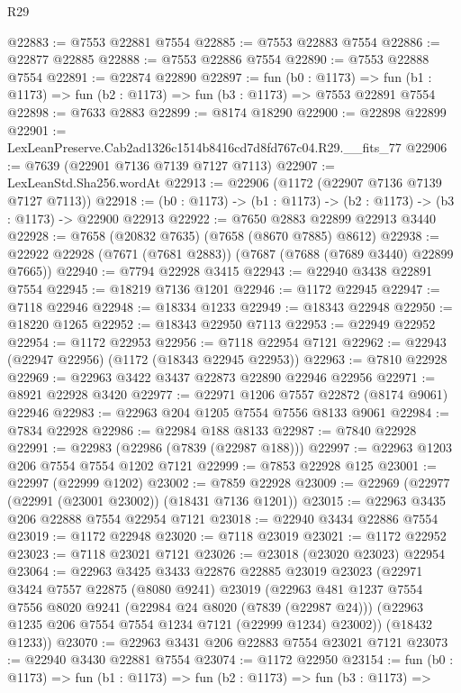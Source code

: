 \begin{lexlean}{R29}
\begin{coremodule}
@22883 := @7553 @22881 @7554
@22885 := @7553 @22883 @7554
@22886 := @22877 @22885
@22888 := @7553 @22886 @7554
@22890 := @7553 @22888 @7554
@22891 := @22874 @22890
@22897 := fun (b0 : @1173) =>
  fun (b1 : @1173) => fun (b2 : @1173) => fun (b3 : @1173) => @7553 @22891 @7554
@22898 := @7633 @2883
@22899 := @8174 @18290
@22900 := @22898 @22899
@22901 := LexLeanPreserve.Cab2ad1326c1514b8416cd7d8fd767c04.R29.__fits_77
@22906 := @7639 (@22901 @7136 @7139 @7127 @7113)
@22907 := LexLeanStd.Sha256.wordAt
@22913 := @22906 (@1172 (@22907 @7136 @7139 @7127 @7113))
@22918 := (b0 : @1173) -> (b1 : @1173) -> (b2 : @1173) -> (b3 : @1173) -> @22900 @22913
@22922 := @7650 @2883 @22899 @22913 @3440
@22928 := @7658 (@20832 @7635) (@7658 (@8670 @7885) @8612)
@22938 := @22922 @22928 (@7671 (@7681 @2883)) (@7687 (@7688 (@7689 @3440) @22899 @7665))
@22940 := @7794 @22928 @3415
@22943 := @22940 @3438 @22891 @7554
@22945 := @18219 @7136 @1201
@22946 := @1172 @22945
@22947 := @7118 @22946
@22948 := @18334 @1233
@22949 := @18343 @22948
@22950 := @18220 @1265
@22952 := @18343 @22950 @7113
@22953 := @22949 @22952
@22954 := @1172 @22953
@22956 := @7118 @22954 @7121
@22962 := @22943 (@22947 @22956) (@1172 (@18343 @22945 @22953))
@22963 := @7810 @22928
@22969 := @22963 @3422 @3437 @22873 @22890 @22946 @22956
@22971 := @8921 @22928 @3420
@22977 := @22971 @1206 @7557 @22872 (@8174 @9061) @22946
@22983 := @22963 @204 @1205 @7554 @7556 @8133 @9061
@22984 := @7834 @22928
@22986 := @22984 @188 @8133
@22987 := @7840 @22928
@22991 := @22983 (@22986 (@7839 (@22987 @188)))
@22997 := @22963 @1203 @206 @7554 @7554 @1202 @7121
@22999 := @7853 @22928 @125
@23001 := @22997 (@22999 @1202)
@23002 := @7859 @22928
@23009 := @22969 (@22977 (@22991 (@23001 @23002)) (@18431 @7136 @1201))
@23015 := @22963 @3435 @206 @22888 @7554 @22954 @7121
@23018 := @22940 @3434 @22886 @7554
@23019 := @1172 @22948
@23020 := @7118 @23019
@23021 := @1172 @22952
@23023 := @7118 @23021 @7121
@23026 := @23018 (@23020 @23023) @22954
@23064 := @22963
    @3425
    @3433
    @22876
    @22885
    @23019
    @23023
    (@22971
      @3424
      @7557
      @22875
      (@8080 @9241)
      @23019
      (@22963
        @481
        @1237
        @7554
        @7556
        @8020
        @9241
        (@22984 @24 @8020 (@7839 (@22987 @24)))
        (@22963 @1235 @206 @7554 @7554 @1234 @7121 (@22999 @1234) @23002))
      (@18432 @1233))
@23070 := @22963 @3431 @206 @22883 @7554 @23021 @7121
@23073 := @22940 @3430 @22881 @7554
@23074 := @1172 @22950
@23154 := fun (b0 : @1173) =>
  fun (b1 : @1173) =>
  fun (b2 : @1173) =>
  fun (b3 : @1173) =>

\end{coremodule}
\end{lexlean}

